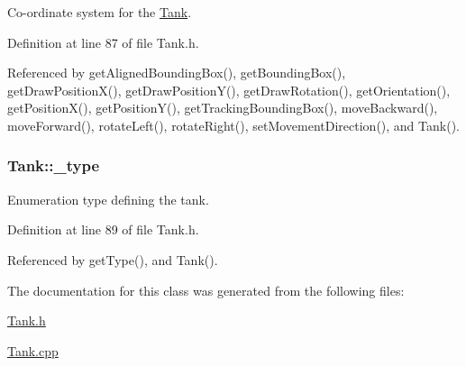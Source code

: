 Co-\/ordinate system for the \hyperlink{classTank}{Tank}. 



Definition at line 87 of file Tank.\-h.



Referenced by get\-Aligned\-Bounding\-Box(), get\-Bounding\-Box(), get\-Draw\-Position\-X(), get\-Draw\-Position\-Y(), get\-Draw\-Rotation(), get\-Orientation(), get\-Position\-X(), get\-Position\-Y(), get\-Tracking\-Bounding\-Box(), move\-Backward(), move\-Forward(), rotate\-Left(), rotate\-Right(), set\-Movement\-Direction(), and Tank().

\hypertarget{classTank_a3758229ef9d41d069e6128b17d414204}{
\subsubsection[{\-\_\-type}]{ Tank\-::\-\_\-type\hspace{0.3cm}{\ttfamily [private]}}}\label{classTank_a3758229ef9d41d069e6128b17d414204}


Enumeration type defining the tank. 



Definition at line 89 of file Tank.\-h.



Referenced by get\-Type(), and Tank().



The documentation for this class was generated from the following files\-:\begin{DoxyCompactItemize}
\item 
\hyperlink{Tank_8h}{Tank.\-h}\item 
\hyperlink{Tank_8cpp}{Tank.\-cpp}\end{DoxyCompactItemize}
